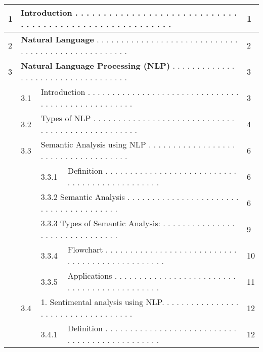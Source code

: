 \documentclass{article} %
\begin{document}
\begin{tabular}{|p{0.2in}|p{0.3in}|p{0.3in}|p{3.1in}|p{0.1in}|} \hline 
1 & \multicolumn{3}{|p{3.8in}|}{I\textbf{ntroduction }. . . . . . . . . . . . . . . . . . . . . . . . . . . . . . . . . . . . . . . . . . . . . . . . . . . . . . . .} & 1 \\ \hline 
2 & \multicolumn{3}{|p{3.8in}|}{\textbf{Natural Language }. . . . . . . . . . . . . . . . . . . . . . . . . . . . . . . . . . . . . . . . . . . . . . . . . . . } & 2 \\ \hline 
3 & \multicolumn{3}{|p{3.8in}|}{\textbf{Natural Language Processing (NLP) }. . . . . . . . . . . . . . . . . . . . . . . . . . . . . . . . . . . } & 3 \\ \hline 
 & 3.1 & \multicolumn{2}{|p{3.5in}|}{ Introduction . . . . . . . . . . . . . . . . . . . . . . . . . . . . . . . . . . . . . . . . . . . . . . . . . .  } & 3 \\ \hline 
 & 3.2 & \multicolumn{2}{|p{3.5in}|}{ Types of NLP . . . . . . . . . . . . . . . . . . . . . . . . . . . . . . . . . . . . . . . . . . . . . . . . . } & 4 \\ \hline 
 & 3.3 & \multicolumn{2}{|p{3.5in}|}{ Semantic Analysis using NLP . . . . . . . . . . . . . . . . . . . . . . . . . . . . . . . . . . . . } & 6 \\ \hline 
 &  & 3.3.1 & Definition . . . . . . . . . . . . . . . . . . . . . . . . . . . . . . . . . . . . . . . . . . . . . .   & 6 \\ \hline 
 &  & \multicolumn{2}{|p{3.5in}|}{3.3.2   Semantic Analysis  . . . . . . . . . . . . . . . . . . . . . . . . . . . . . . . . . . . . . . . } & 6 \\ \hline 
 &  & \multicolumn{2}{|p{3.5in}|}{3.3.3   Types of Semantic Analysis: . . . . . . . . . . . . . . . . . . . . . . . . . . . . . . . } & 9 \\ \hline 
 &  & 3.3.4 & Flowchart . . . . . . . . . . . . . . . . . . . . . . . . . . . . . . . . . . . . . . . . . . . . . . .  & 10 \\ \hline 
 &  & 3.3.5 & Applications  . . . . . . . . . . . . . . . . . . . . . . . . . . . . . . . . . . . . . . . . . . . .  & 11 \\ \hline 
 & 3.4 & \multicolumn{2}{|p{3.5in}|}{     1.   Sentimental analysis using NLP. . . . . . . . . . . . . . . . . . . . . . . . . . . . . . . . . . .} & 12 \\ \hline 
 &  & 3.4.1 & Definition . . . . . . . . . . . . . . . . . . . . . . . . . . . . . . . . . . . . . . . . . . . . . .   & 12 \\ \hline 

\end{tabular}
\end{document}
